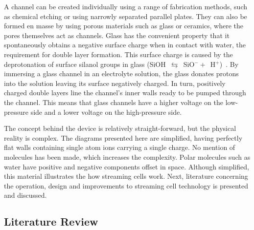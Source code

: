   A channel can be created individually using a range of fabrication methods, such as chemical etching or using narrowly separated parallel plates.
  They can also be formed en masse by using porous materials such as glass or ceramics, where the pores themselves act as channels.
  Glass has the convenient property that it spontaneously obtains a negative surface charge when in contact with water, the requirement for double layer formation.
  This surface charge is caused by the deprotonation of surface silanol groups in glass (SiOH~$\leftrightarrows$~SiO$^{-}+$~H$^{+}$)~\cite{Kirby2004}.
  By immersing a glass channel in an electrolyte solution, the glass donates protons into the solution leaving its surface negatively charged.
  In turn, positively charged double layers line the channel's inner walls ready to be pumped through the channel.
  This means that glass channels have a higher voltage on the low-pressure side and a lower voltage on the high-pressure side.

  The concept behind the device is relatively straight-forward, but the physical reality is complex.
  The diagrams presented here are simplified, having perfectly flat walls containing single atom ions carrying a single charge.
  No mention of molecules has been made, which increases the complexity.
  Polar molecules such as water have positive and negative components offset in space.
  Although simplified, this material illustrates the how streaming cells work.
  Next, literature concerning the operation, design and improvements to streaming cell technology is presented and discussed.


  \subsection{Literature Review}
    \label{sub:background_streamingCells_literatureReview}


